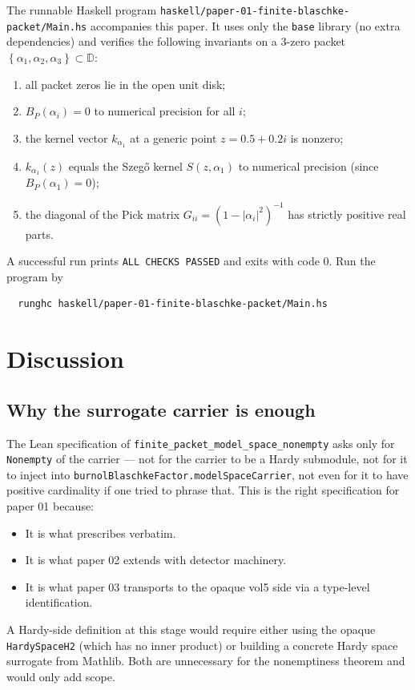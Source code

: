 \documentclass[11pt]{article}
\theoremstyle{plain}
\theoremstyle{definition}
\theoremstyle{remark}
\newcommand{\D}{\mathbb{D}}
\newcommand{\Set}[1]{\left\{ #1 \right\}}
\newcommand{\code}[1]{\texttt{#1}}
\begin{document}
The runnable Haskell program
\code{haskell/paper-01-finite-blaschke-packet/Main.hs} accompanies this
paper.  It uses only the \code{base} library (no extra dependencies) and
verifies the following invariants on a 3-zero packet
\(\Set{\alpha_{1},\alpha_{2},\alpha_{3}}\subset\D\):
\begin{enumerate}
  \item all packet zeros lie in the open unit disk;
  \item $B_{P}(\alpha_{i}) = 0$ to numerical precision for all $i$;
  \item the kernel vector $k_{\alpha_{1}}$ at a generic point
        $z = 0.5+0.2i$ is nonzero;
  \item $k_{\alpha_{1}}(z)$ equals the Szegő kernel $S(z,\alpha_{1})$
        to numerical precision (since $B_{P}(\alpha_{1}) = 0$);
  \item the diagonal of the Pick matrix $G_{ii} =
        (1-|\alpha_{i}|^{2})^{-1}$ has strictly positive real parts.
\end{enumerate}
A successful run prints \code{ALL CHECKS PASSED} and exits with code 0.
Run the program by
\begin{verbatim}
  runghc haskell/paper-01-finite-blaschke-packet/Main.hs
\end{verbatim}

\section{Discussion}\label{sec:discussion}

\subsection{Why the surrogate carrier is enough}

The Lean specification of
\code{finite\_packet\_model\_space\_nonempty}
asks only for \code{Nonempty} of the carrier --- not for the carrier to be
a Hardy submodule, not for it to inject into
\code{burnolBlaschkeFactor.modelSpaceCarrier}, not even for it to have
positive cardinality if one tried to phrase that.  This is the right
specification for paper 01 because:
\begin{itemize}
  \item It is what \cite{vol5NextSteps} prescribes verbatim.
  \item It is what paper 02 extends with detector machinery.
  \item It is what paper 03 transports to the opaque vol5 side via a
        type-level identification.
\end{itemize}
A Hardy-side definition at this stage would require either using the
opaque \code{HardySpaceH2} (which has no inner product) or building a
concrete Hardy space surrogate from Mathlib.  Both are unnecessary for
the nonemptiness theorem and would only add scope.
\end{document}
